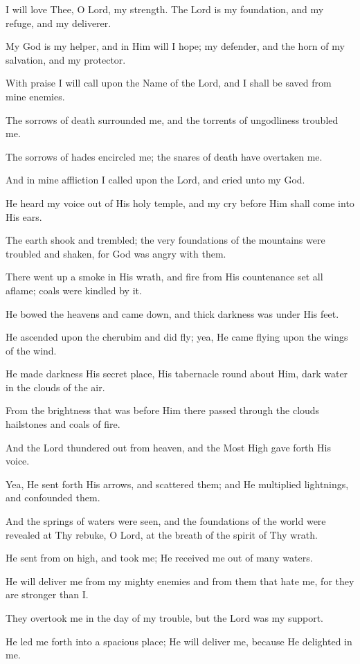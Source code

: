 I will love Thee, O Lord, my strength. The Lord is my foundation, and my refuge, and my deliverer.

My God is my helper, and in Him will I hope; my defender, and the horn of my salvation, and my protector.

With praise I will call upon the Name of the Lord, and I shall be saved from mine enemies.

The sorrows of death surrounded me, and the torrents of ungodliness troubled me.

The sorrows of hades encircled me; the snares of death have overtaken me.

And in mine affliction I called upon the Lord, and cried unto my God.

He heard my voice out of His holy temple, and my cry before Him shall come into His ears.

The earth shook and trembled; the very foundations of the mountains were troubled and shaken, for God was angry with them.

There went up a smoke in His wrath, and fire from His countenance set all aflame; coals were kindled by it.

He bowed the heavens and came down, and thick darkness was under His feet.

He ascended upon the cherubim and did fly; yea, He came flying upon the wings of the wind.

He made darkness His secret place, His tabernacle round about Him, dark water in the clouds of the air.

From the brightness that was before Him there passed through the clouds hailstones and coals of fire.

And the Lord thundered out from heaven, and the Most High gave forth His voice.

Yea, He sent forth His arrows, and scattered them; and He multiplied lightnings, and confounded them.

And the springs of waters were seen, and the foundations of the world were revealed at Thy rebuke, O Lord, at the breath of the spirit of Thy wrath.

He sent from on high, and took me; He received me out of many waters.

He will deliver me from my mighty enemies and from them that hate me, for they are stronger than I.

They overtook me in the day of my trouble, but the Lord was my support.

He led me forth into a spacious place; He will deliver me, because He delighted in me.

